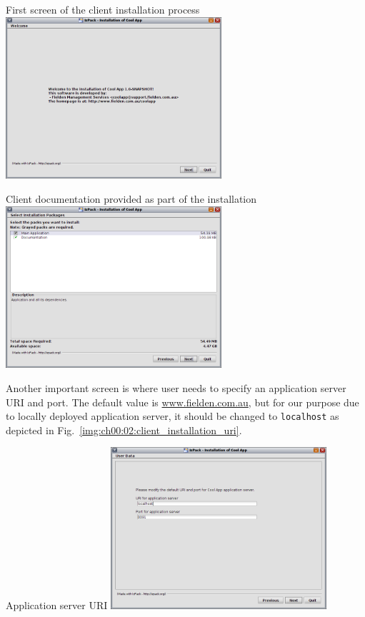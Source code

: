   \begin{image}{First screen of the client installation process}{\label{img:ch00:02:client_installation_first_screen}}    
    \includegraphics[width=0.6\textwidth]{parts/00-part/chapters/01-application-modules/images/01-client-installation.png}
  \end{image}

  \begin{image}{Client documentation provided as part of the installation}{\label{img:ch00:02:client_installation_doc}}    
    \includegraphics[width=0.6\textwidth]{parts/00-part/chapters/01-application-modules/images/02-client-installation-doc.png}
  \end{image}

  Another important screen is where user needs to specify an application server URI and port.
  The default value is \url{www.fielden.com.au}, but for our purpose due to locally deployed application server, it should be changed to \texttt{localhost} as depicted in Fig.~\ref{img:ch00:02:client_installation_uri}.

  \begin{image}{Application server URI}{\label{img:ch00:02:client_installation_uri}}    
    \includegraphics[width=0.6\textwidth]{parts/00-part/chapters/01-application-modules/images/03-client-installation-uri.png}
  \end{image}
  
